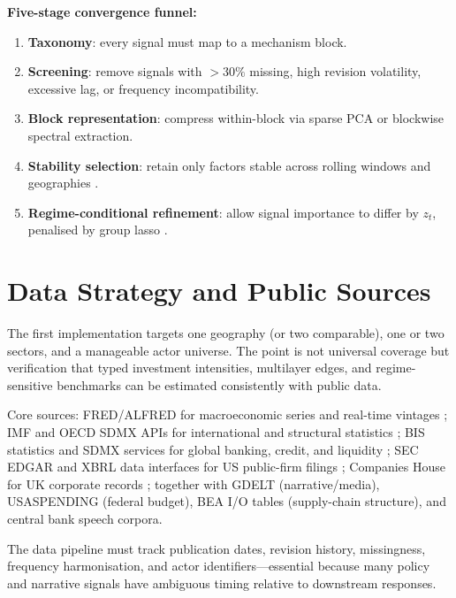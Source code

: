 \documentclass[11pt,a4paper]{article}
\theoremstyle{definition}
\begin{document}
\textbf{Five-stage convergence funnel:}
\begin{enumerate}[label=\textbf{Stage~\arabic*},nosep]
  \item \textbf{Taxonomy}: every signal must map to a mechanism block.
  \item \textbf{Screening}: remove signals with $>30\%$ missing, high revision volatility, excessive lag, or frequency incompatibility.
  \item \textbf{Block representation}: compress within-block via sparse PCA or blockwise spectral extraction.
  \item \textbf{Stability selection}: retain only factors stable across rolling windows and geographies \citep{meinshausen2010stability}.
  \item \textbf{Regime-conditional refinement}: allow signal importance to differ by $z_t$, penalised by group lasso \citep{yuan2006model}.
\end{enumerate}


\section{Data Strategy and Public Sources}
\label{sec:data}

\begin{greenbox}
The first implementation targets one geography (or two comparable), one or two sectors, and a manageable actor universe. The point is not universal coverage but verification that typed investment intensities, multilayer edges, and regime-sensitive benchmarks can be estimated consistently with public data.
\end{greenbox}

Core sources: FRED/ALFRED for macroeconomic series and real-time vintages \citep{fredapi2026}; IMF and OECD SDMX APIs for international and structural statistics \citep{imfapi2026,oecdapi2025}; BIS statistics and SDMX services for global banking, credit, and liquidity \citep{bisapi2026}; SEC EDGAR and XBRL data interfaces for US public-firm filings \citep{secapi2024}; Companies House for UK corporate records \citep{companieshouse2026}; together with GDELT (narrative/media), USASPENDING (federal budget), BEA I/O tables (supply-chain structure), and central bank speech corpora.

The data pipeline must track publication dates, revision history, missingness, frequency harmonisation, and actor identifiers---essential because many policy and narrative signals have ambiguous timing relative to downstream responses.
\end{document}
